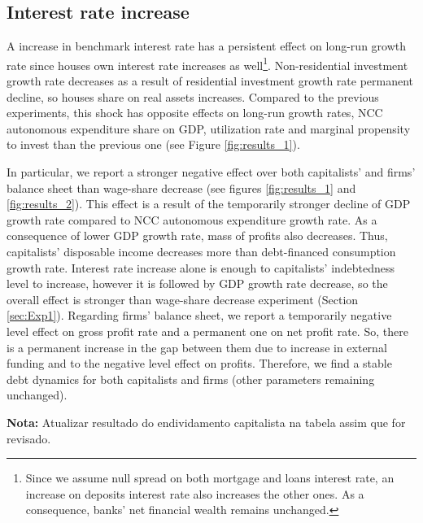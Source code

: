 \documentclass[11pt]{article}
\begin{document}
\subsection{Interest rate increase}
\label{sec:org4c9b254}
\label{sec:Exp3}

A increase in benchmark interest rate  has a persistent effect on long-run growth rate since houses own interest rate increases as well\footnote{Since we assume null spread on both mortgage and loans interest rate, an increase on deposits interest rate also increases the other ones. As a consequence, banks' net financial wealth remains unchanged.}.
Non-residential investment growth rate decreases as a result of residential investment growth rate permanent decline, so houses share on real assets increases.
Compared to the previous experiments, this shock has opposite effects on long-run growth rates, NCC autonomous expenditure share on GDP, utilization rate and marginal propensity to invest  than the previous one (see Figure \ref{fig:results_1}).


In particular, we report a stronger negative effect over both capitalists' and firms' balance sheet than wage-share decrease (see figures \ref{fig:results_1} and \ref{fig:results_2}).
This effect is a result of the temporarily stronger decline of GDP growth rate compared to NCC autonomous expenditure growth rate.
As a consequence of lower GDP growth rate, mass of profits also decreases.
Thus, capitalists' disposable income decreases more than debt-financed consumption growth rate.
Interest rate increase alone is enough to capitalists' indebtedness level to increase, however it is followed by GDP growth rate decrease, so the overall effect is stronger than wage-share decrease experiment (Section \ref{sec:Exp1}).
Regarding firms' balance sheet, we report a temporarily negative level effect on gross profit rate and a permanent one on net profit rate. 
So, there is a permanent increase in the gap between them due to increase in external funding and to the negative level effect on profits.
Therefore, we find a stable debt dynamics for both capitalists and firms (other parameters remaining unchanged).

\textbf{Nota:} Atualizar resultado do endividamento capitalista na tabela assim que for revisado.
\end{document}
